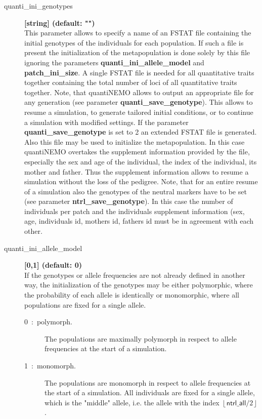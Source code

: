 \documentclass[letterpaper,12pt,oneside]{book}
\begin{document}
\begin{description}
\item[quanti\_ini\_genotypes] \textbf{[string] (default: "")}\\
This parameter allows to specify a name of an FSTAT file \citep{Goudet_1995} containing the initial genotypes of the individuals for each population. If such a file is present the initialization of the metapopulation is done solely by this file ignoring the parameters \textbf{quanti\_ini\_allele\_model} and \textbf{patch\_ini\_size}. A single FSTAT file is needed for all quantitative traits together containing the total number of loci of all quantitative traits together. Note, that quantiNEMO allows to output an appropriate file for any generation (see parameter \textbf{quanti\_save\_genotype}). This allows to resume a simulation, to generate tailored initial conditions, or to continue a simulation with modified settings. If the parameter \textbf{quanti\_save\_genotype} is set to 2 an extended FSTAT file is generated. Also this file may be used to initialize the metapopulation. In this case quantiNEMO overtakes the supplement information provided by the file, especially the sex and age of the individual, the index of the individual, its mother and father. Thus the supplement information allows to resume a simulation without the loss of the pedigree. Note, that for an entire resume of a simulation also the genotypes of the neutral markers have to be set (see parameter \textbf{ntrl\_save\_genotype}). In this case the number of individuals per patch and the individuals supplement information (sex, age, individuals id, mothers id, fathers id must be in agreement with each other. 

\item[quanti\_ini\_allele\_model] \textbf{[0,1] (default: 0)}\\
If the genotypes or allele frequencies are not already defined in another way, the initialization of the genotypes may be either polymorphic, where the probability of each allele is identically or monomorphic, where all populations are fixed for a single allele.   
\begin{description}
\item[0~:~polymorph.] The populations are maximally polymorph in respect to allele frequencies at the start of a simulation.
\item[1~:~monomorph.] The populations are monomorph in respect to allele frequencies at the start of a simulation. All individuals are fixed for a single allele, which is  the "middle" allele, i.e. the allele with the index $\left\lfloor \textsf{ntrl\_all}/2\right\rfloor$.
\end{description}
\end{description}
\end{document}
